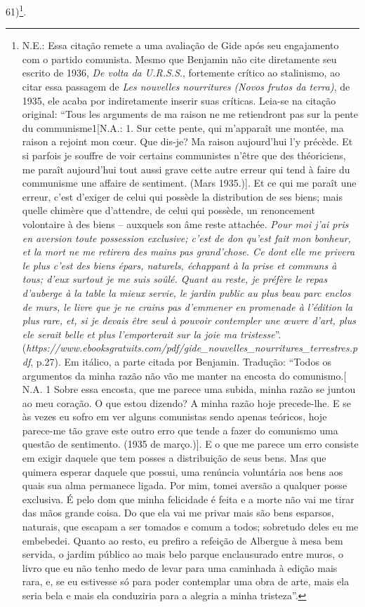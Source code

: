 61)\footnote{N.E.: Essa citação remete a uma avaliação de Gide após seu
  engajamento com o partido comunista. Mesmo que Benjamin não cite
  diretamente seu escrito de 1936, \emph{De volta da U.R.S.S}.,
  fortemente crítico ao stalinismo, ao citar essa passagem de \emph{Les
  nouvelles nourritures} \emph{(Novos frutos da terra)}, de 1935, ele
  acaba por indiretamente inserir suas críticas. Leia-se na citação
  original: ``Tous les arguments de ma raison ne me retiendront pas sur
  la pente du communisme1{[}N.A.: 1. Sur cette pente, qui m'apparaît une
  montée, ma raison a rejoint mon cœur. Que dis-je? Ma raison
  aujourd'hui l'y précède. Et si parfois je souffre de voir certains
  communistes n'être que des théoriciens, me paraît aujourd'hui tout
  aussi grave cette autre erreur qui tend à faire du communisme une
  affaire de sentiment. (Mars 1935.){]}. Et ce qui me paraît une erreur,
  c'est d'exiger de celui qui possède la distribution de ses biens; mais
  quelle chimère que d'attendre, de celui qui possède, un renoncement
  volontaire à des biens -- auxquels son âme reste attachée. \emph{Pour
  moi j'ai pris en aversion toute possession exclusive; c'est de don
  qu'est fait mon bonheur, et la mort ne me retirera des mains pas
  grand'chose. Ce dont elle me privera le plus c'est des biens épars,
  naturels, échappant à la prise et communs à tous; d'eux surtout je me
  suis soûlé. Quant au reste, je préfère le repas d'auberge à la table
  la mieux servie, le jardin public au plus beau parc enclos de murs, le
  livre que je ne crains pas d'emmener en promenade à l'édition}
  \emph{la plus rare, et, si je devais être seul à pouvoir contempler
  une œuvre d'art, plus ele serait belle et plus l'}\emph{emporterait
  sur la joie ma tristesse}''.
  (\emph{https://www.ebooksgratuits.com/pdf/gide\_nouvelles\_nourritures\_terrestres.pdf},
  p.27). Em itálico, a parte citada por Benjamin. Tradução: ``Todos os
  argumentos da minha razão não vão me manter na encosta do
  comunismo.[ N.A. 1 Sobre essa encosta, que me parece uma subida,
  minha razão se juntou ao meu coração. O que estou dizendo? A minha
  razão hoje precede-lhe. E se às vezes eu sofro em ver alguns
  comunistas sendo apenas teóricos, hoje parece-me tão grave este outro
  erro que tende a fazer do comunismo uma questão de sentimento. (1935
  de março.)]. E o que me parece um erro consiste em exigir daquele
  que tem posses a distribuição de seus bens. Mas que quimera esperar
  daquele que possui, uma renúncia voluntária aos bens aos quais sua
  alma permanece ligada. Por mim, tomei aversão a qualquer posse
  exclusiva. É pelo dom que minha felicidade é feita e a morte não vai
  me tirar das mãos grande coisa. Do que ela vai me privar mais são bens
  esparsos, naturais, que escapam a ser tomados e comum a todos;
  sobretudo deles eu me embebedei. Quanto ao resto, eu prefiro a
  refeição de Albergue à mesa bem servida, o jardim público ao mais belo
  parque enclausurado entre muros, o livro que eu não tenho medo de
  levar para uma caminhada à edição mais rara, e, se eu estivesse só
  para poder contemplar uma obra de arte, mais ela seria bela e mais ela
  conduziria para a alegria a minha tristeza''.}.

